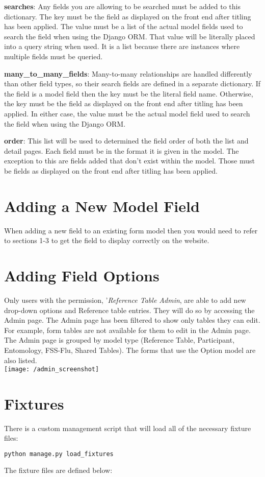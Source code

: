 \documentclass{article}
\begin{document}
\textbf{searches}: Any fields you are allowing to be searched must be added to this dictionary. The key must be the field as displayed on the front end after titling has been applied. The value must be a list of the actual model fields used to search the field when using the Django ORM. That value will be literally placed into a query string when used. It is a list because there are instances where multiple fields must be queried.

\textbf{many\_to\_many\_fields}: Many-to-many relationships are handled differently than other field types, so their search fields are defined in a separate dictionary. If the field is a model field then the key must be the literal field name. Otherwise, the key must be the field as displayed on the front end after titling has been applied. In either case, the value must be the actual model field used to search the field when using the Django ORM.

\textbf{order}: This list will be used to determined the field order of both the list and detail pages.  Each field must be in the format it is given in the model.  The exception to this are fields added that don't exist within the model. Those must be fields as displayed on the front end after titling has been applied.

\section{Adding a New Model Field}
When adding a new field to an existing form model then you would need to refer to sections 1-3 to get the field to display correctly on the website.

\section{Adding Field Options}
Only users with the permission, '\textit{Reference Table Admin}, are able to add new drop-down options and Reference table entries.  They will do so by accessing the Admin page.  The Admin page has been filtered to show only tables they can edit. For example, form tables are not available for them to edit in the Admin page. The Admin page is grouped by model type (Reference Table, Participant, Entomology, FSS-Flu, Shared Tables). The forms that use the Option model are also listed. 
\\
\texttt{[image: /admin\_screenshot]}
\section{Fixtures}
There is a custom management script that will load all of the necessary fixture files:
\begin{lstlisting}[language=bash]
  python manage.py load_fixtures
\end{lstlisting}
The fixture files are defined below:
\end{document}
